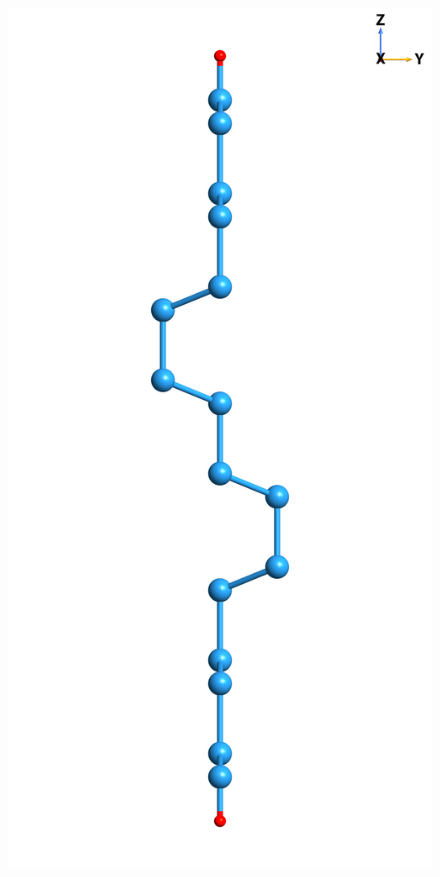 \begin{figure}
\begin{minipage}[b]{0.31\textwidth}
        \label{fig:1x1front}
    \end{minipage}
    \begin{minipage}[b]{0.31\textwidth}
        \centering
        \includegraphics[width=\textwidth]{content/figures/source/structure/Si1x1-side}

\end{minipage}
\end{figure}
